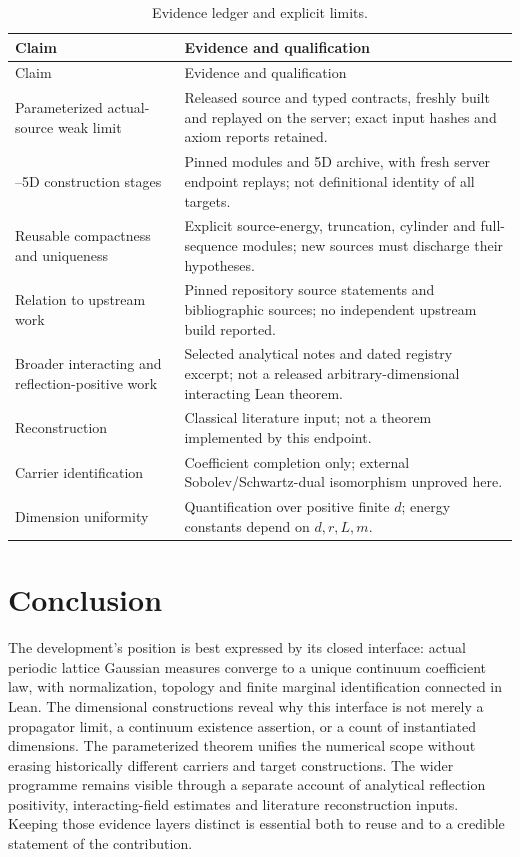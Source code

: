 \documentclass[11pt]{amsart}
\theoremstyle{remark}\newtheorem{remark}[theorem]{Remark}
\begin{document}
\begin{longtable}{@{}>{\raggedright\arraybackslash}p{}>{\raggedright\arraybackslash}p{}@{}}
\caption{Evidence ledger and explicit limits.}\label{tab:evidence}\\
\toprule Claim & Evidence and qualification\\\midrule\endfirsthead
\toprule Claim & Evidence and qualification\\\midrule\endhead
Parameterized actual-source weak limit & Released source and typed contracts, freshly built and replayed on the server; exact input hashes and axiom reports retained.\\
2--5D construction stages & Pinned modules and 5D archive, with fresh server endpoint replays; not definitional identity of all targets.\\
Reusable compactness and uniqueness & Explicit source-energy, truncation, cylinder and full-sequence modules; new sources must discharge their hypotheses.\\
Relation to upstream work & Pinned repository source statements and bibliographic sources; no independent upstream build reported.\\
Broader interacting and reflection-positive work & Selected analytical notes and dated registry excerpt; not a released arbitrary-dimensional interacting Lean theorem.\\
Reconstruction & Classical literature input; not a theorem implemented by this endpoint.\\
Carrier identification & Coefficient completion only; external Sobolev/Schwartz-dual isomorphism unproved here.\\
Dimension uniformity & Quantification over positive finite $d$; energy constants depend on $d,r,L,m$.\\\bottomrule
\end{longtable}

\section{Conclusion}
The development's position is best expressed by its closed interface: actual periodic lattice Gaussian measures converge to a unique continuum coefficient law, with normalization, topology and finite marginal identification connected in Lean. The dimensional constructions reveal why this interface is not merely a propagator limit, a continuum existence assertion, or a count of instantiated dimensions. The parameterized theorem unifies the numerical scope without erasing historically different carriers and target constructions. The wider programme remains visible through a separate account of analytical reflection positivity, interacting-field estimates and literature reconstruction inputs. Keeping those evidence layers distinct is essential both to reuse and to a credible statement of the contribution.
\end{document}
